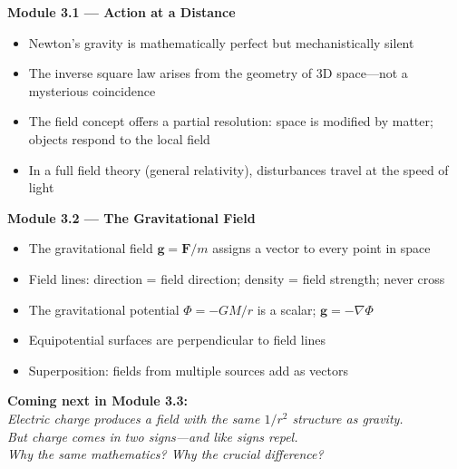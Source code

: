 \documentclass[12pt, a4paper, twoside]{book}
\theoremstyle{disc}
\begin{document}
\vspace{0.3cm}

\begin{tcolorbox}[enhanced, colback=deep!4, colframe=deep,
  title={\bfseries\color{white} Key Ideas So Far in Journey 3},
  attach boxed title to top left={yshift=-2mm,xshift=4mm},
  boxed title style={colback=deep}]

\textbf{Module 3.1 --- Action at a Distance}
\begin{itemize}[leftmargin=1.5em,itemsep=2pt]
  \item Newton's gravity is mathematically perfect but mechanistically silent
  \item The inverse square law arises from the geometry of 3D space---not a mysterious coincidence
  \item The field concept offers a partial resolution: space is modified by matter; objects respond to the local field
  \item In a full field theory (general relativity), disturbances travel at the speed of light
\end{itemize}

\vspace{6pt}
\textbf{Module 3.2 --- The Gravitational Field}
\begin{itemize}[leftmargin=1.5em,itemsep=2pt]
  \item The gravitational field $\bm{g} = \bm{F}/m$ assigns a vector to every point in space
  \item Field lines: direction = field direction; density = field strength; never cross
  \item The gravitational potential $\Phi = -GM/r$ is a scalar; $\bm{g} = -\nabla\Phi$
  \item Equipotential surfaces are perpendicular to field lines
  \item Superposition: fields from multiple sources add as vectors
\end{itemize}
\end{tcolorbox}

\vspace{0.6cm}
\begin{center}
\end{center}

\vspace{0.5cm}
\begin{center}
{\large\textcolor{deep}{\textbf{Coming next in Module 3.3:}}}\\[6pt]
{\itshape\textcolor{midblue}{%
Electric charge produces a field with the same $1/r^2$ structure as gravity.\\[3pt]
But charge comes in two signs---and like signs \emph{repel}.\\[3pt]
Why the same mathematics? Why the crucial difference?
}}
\end{center}
\end{document}
